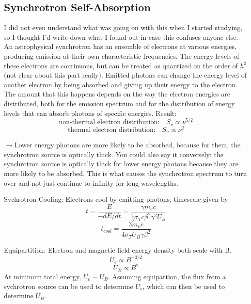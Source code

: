 \subsection{Synchrotron Self-Absorption}
	I did not even understand what was going on with this when I started studying, so I thought I'd write down what I found out in case this confuses anyone else.
	An astrophysical synchrotron has an ensemble of electrons at various energies, producing emission at their own characteristic frequencies. The energy levels of these electrons are continuous, but can be treated as quantized on the order of $h^{3}$ (not clear about this part really). Emitted photons can change the energy level of another electron by being absorbed and giving up their energy to the electron.
	The amount that this happens depends on the way the electron energies are distributed, both for the emission spectrum and for the distribution of energy levels that can absorb photons of specific energies.
	Result:
	\begin{equation}
	\text{non-thermal electron distribution:} \quad S_{\nu} \propto \nu^{5/2}		
	\end{equation}
	\begin{equation}
	\text{thermal electron distribution:} \quad S_{\nu} \propto \nu^{2}		
	\end{equation}
	
	$\rightarrow$Lower energy photons are more likely to be absorbed, because for them, the synchrotron source is optically thick. You could also say it conversely: the synchrotron source is optically thick for lower energy photons because they are more likely to be absorbed. This is what causes the synchrotron spectrum to turn over and not just continue to infinity for long wavelengths.

Sychrotron Cooling:
Electrons cool by emitting photons, timescale given by
\begin{displaymath}t=\frac{E}{-dE/dt}=\frac{\gamma m_ec}{\frac{4}{3}\sigma_Tc\beta^2\gamma^2U_B}\end{displaymath}
\begin{displaymath}\boxed{t_{cool}=\frac{3m_ec}{4\sigma_TU_B\gamma \beta^2}}\end{displaymath}

Equipartition:
Electron and magnetic field energy density both scale with B.
\begin{displaymath}U_e\propto B^{-3/2}\end{displaymath}
\begin{displaymath}U_B\propto B^2\end{displaymath}
At minimum total energy, $U_e\sim U_B$.  Assuming equipartion, the flux from a sychrotron source 
can be used to determine $U_e$, which can then be used to determine $U_B$.

